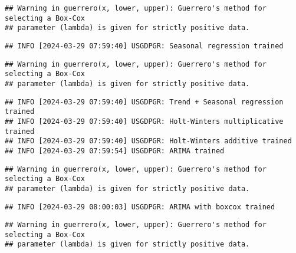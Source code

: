 \documentclass[
]{article}
\begin{document}
\begin{verbatim}
## Warning in guerrero(x, lower, upper): Guerrero's method for selecting a Box-Cox
## parameter (lambda) is given for strictly positive data.
\end{verbatim}

\begin{verbatim}
## INFO [2024-03-29 07:59:40] USGDPGR: Seasonal regression trained
\end{verbatim}

\begin{verbatim}
## Warning in guerrero(x, lower, upper): Guerrero's method for selecting a Box-Cox
## parameter (lambda) is given for strictly positive data.
\end{verbatim}

\begin{verbatim}
## INFO [2024-03-29 07:59:40] USGDPGR: Trend + Seasonal regression trained
## INFO [2024-03-29 07:59:40] USGDPGR: Holt-Winters multiplicative trained
## INFO [2024-03-29 07:59:40] USGDPGR: Holt-Winters additive trained
## INFO [2024-03-29 07:59:54] USGDPGR: ARIMA trained
\end{verbatim}

\begin{verbatim}
## Warning in guerrero(x, lower, upper): Guerrero's method for selecting a Box-Cox
## parameter (lambda) is given for strictly positive data.
\end{verbatim}

\begin{verbatim}
## INFO [2024-03-29 08:00:03] USGDPGR: ARIMA with boxcox trained
\end{verbatim}

\begin{verbatim}
## Warning in guerrero(x, lower, upper): Guerrero's method for selecting a Box-Cox
## parameter (lambda) is given for strictly positive data.
\end{verbatim}
\end{document}
